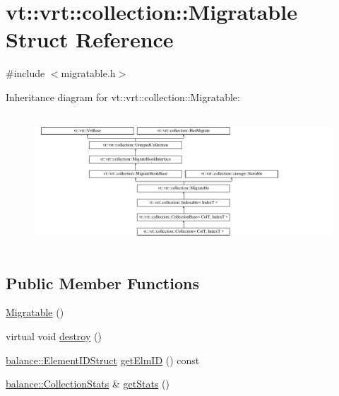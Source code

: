 \hypertarget{structvt_1_1vrt_1_1collection_1_1_migratable}{}\section{vt\+:\+:vrt\+:\+:collection\+:\+:Migratable Struct Reference}
\label{structvt_1_1vrt_1_1collection_1_1_migratable}


{\ttfamily \#include $<$migratable.\+h$>$}

Inheritance diagram for vt\+:\+:vrt\+:\+:collection\+:\+:Migratable\+:\begin{figure}[H]
\begin{center}
\leavevmode
\includegraphics[height=5.028059cm]{structvt_1_1vrt_1_1collection_1_1_migratable}
\end{center}
\end{figure}
\subsection*{Public Member Functions}
\begin{DoxyCompactItemize}
\item 
\hyperlink{structvt_1_1vrt_1_1collection_1_1_migratable_a598f0bb3acfb602d437eab3625b105c5}{Migratable} ()
\item 
virtual void \hyperlink{structvt_1_1vrt_1_1collection_1_1_migratable_a31effa8f54013d1a1794cd025c24e410}{destroy} ()
\item 
\hyperlink{namespacevt_1_1vrt_1_1collection_1_1balance_a9f5b53fafb270212279a4757d2c4cd28}{balance\+::\+Element\+I\+D\+Struct} \hyperlink{structvt_1_1vrt_1_1collection_1_1_migratable_a1b074bbe076e5eb0f83141e4b4504afe}{get\+Elm\+ID} () const
\item 
\hyperlink{structvt_1_1vrt_1_1collection_1_1balance_1_1_collection_stats}{balance\+::\+Collection\+Stats} \& \hyperlink{structvt_1_1vrt_1_1collection_1_1_migratable_a1e005e88a9199c3f650ccd178dfaceb9}{get\+Stats} ()
\end{DoxyCompactItemize}
